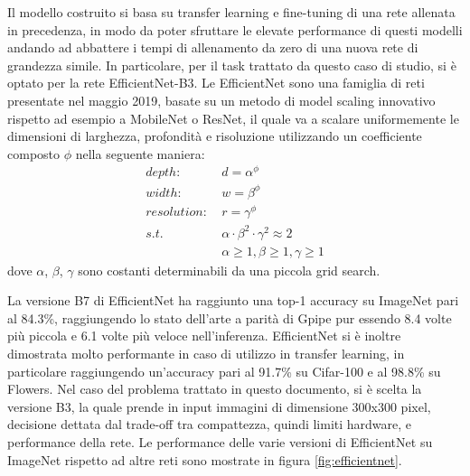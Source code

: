         Il modello costruito si basa su transfer learning e fine-tuning di una rete allenata in precedenza, in modo da poter sfruttare le elevate performance di questi modelli andando
        ad abbattere i tempi di allenamento da zero di una nuova rete di grandezza simile. In particolare, per il task trattato da questo caso di studio, si è optato per la rete 
        EfficientNet-B3. Le EfficientNet sono una famiglia di reti presentate nel maggio 2019, basate su un metodo di model scaling innovativo rispetto ad esempio a MobileNet o ResNet, il quale va a scalare uniformemente le dimensioni di larghezza, profondità e risoluzione utilizzando un coefficiente composto $\phi$ nella seguente maniera:
        \begin{equation}
            \begin{split}
                depth:&\ d = \alpha^\phi\\
                width:&\ w = \beta^\phi\\
                resolution:&\  r = \gamma^\phi\\
                s.t.&\ \alpha \cdot \beta^2 \cdot \gamma^2 \approx 2\\
                &\ \alpha\geq1, \beta\geq1, \gamma\geq1
            \end{split}
        \end{equation}
        dove $\alpha$, $\beta$, $\gamma$ sono costanti determinabili da una piccola grid search.
        
        La versione B7 di EfficientNet ha raggiunto una top-1 accuracy su ImageNet pari al 84.3\%, raggiungendo lo stato dell'arte a parità di Gpipe pur essendo 8.4 volte più piccola e 6.1 volte più veloce nell'inferenza.
        EfficientNet si è inoltre dimostrata molto performante in caso di utilizzo in transfer learning, in particolare raggiungendo un'accuracy pari al 91.7\% su Cifar-100 e al 98.8\% su Flowers. Nel caso del problema trattato in questo documento, si è scelta la versione B3, la quale prende in input immagini di dimensione 300x300 pixel, decisione dettata dal trade-off tra compattezza, quindi limiti hardware, e performance della rete. \cite{tan2020efficientnet}
        Le performance delle varie versioni di EfficientNet su ImageNet rispetto ad altre reti sono mostrate in figura \ref{fig:efficientnet}.

